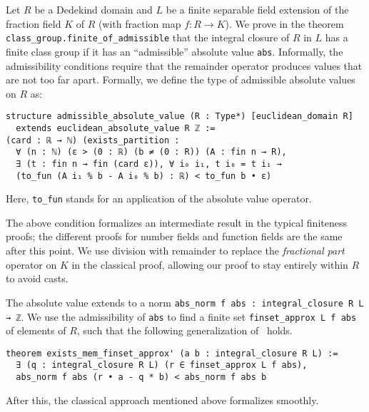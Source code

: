 \documentclass[a4paper,USenglish,cleveref, autoref, thm-restate]{lipics-v2021}
\newcommand{\lean}[1]{\texttt{#1}\xspace} %
\begin{document}
Let $R$ be a Dedekind domain and $L$ be a finite separable field extension of the fraction field $K$ of $R$ (with fraction map $f : R \to K$).
We prove in the theorem \lean{class\_group.finite\_of\_admissible} that the integral closure of $R$ in $L$ has a finite class group if it has an ``admissible'' absolute value \lean{abs}.
Informally, the admissibility conditions require that the remainder operator produces values that are not too far apart.
Formally, we define the type of admissible absolute values on $R$ as:
\begin{lstlisting}
structure admissible_absolute_value (R : Type*) [euclidean_domain R]
  extends euclidean_absolute_value R ℤ :=
(card : ℝ → ℕ) (exists_partition :
  ∀ (n : ℕ) (ε > (0 : ℝ) (b ≠ (0 : R)) (A : fin n → R),
  ∃ (t : fin n → fin (card ε)), ∀ i₀ i₁, t i₀ = t i₁ →
  (to_fun (A i₁ % b - A i₀ % b) : ℝ) < to_fun b • ε)
\end{lstlisting}
Here, \lean{to\_fun} stands for an application of the absolute value operator.

The above condition formalizes an intermediate result in the typical finiteness proofs;
the different proofs for number fields and function fields are the same after this point.
We use division with remainder to replace the \emph{fractional part} operator on $K$ in the classical proof,
allowing our proof to stay entirely within $R$ to avoid casts.

The absolute value extends to a norm \lean{abs\_norm f abs : integral\_closure R L → ℤ}.
We use the admissibility of \lean{abs} to find a finite set \lean{finset\_approx L f abs} of elements of $R$,
such that the following generalization of~\cite[Theorem 12.2.1]{Ireland-Rosen} holds.
\begin{lstlisting}
theorem exists_mem_finset_approx' (a b : integral_closure R L) :=
  ∃ (q : integral_closure R L) (r ∈ finset_approx L f abs),
  abs_norm f abs (r • a - q * b) < abs_norm f abs b
\end{lstlisting}
After this, the classical approach mentioned above formalizes smoothly.
\end{document}
